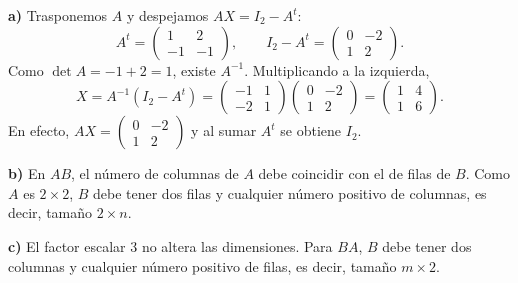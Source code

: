 \textbf{a)} Trasponemos $A$ y despejamos $AX=I_2-A^t$:
\[
 A^t=\begin{pmatrix}1&2\\-1&-1\end{pmatrix},
 \qquad I_2-A^t=\begin{pmatrix}0&-2\\1&2\end{pmatrix}.
\]
Como $\det A=-1+2=1$, existe $A^{-1}$. Multiplicando a la izquierda,
\[
 X=A^{-1}(I_2-A^t)
 =\begin{pmatrix}-1&1\\-2&1\end{pmatrix}
  \begin{pmatrix}0&-2\\1&2\end{pmatrix}
 =\boxed{\begin{pmatrix}1&4\\1&6\end{pmatrix}}.
\]
En efecto, $AX=\begin{pmatrix}0&-2\\1&2\end{pmatrix}$ y al sumar $A^t$ se obtiene $I_2$.

\textbf{b)} En $AB$, el número de columnas de $A$ debe coincidir con el de filas de $B$. Como $A$ es $2\times2$, $B$ debe tener dos filas y cualquier número positivo de columnas, es decir, tamaño $2\times n$.

\textbf{c)} El factor escalar 3 no altera las dimensiones. Para $BA$, $B$ debe tener dos columnas y cualquier número positivo de filas, es decir, tamaño $m\times2$.
